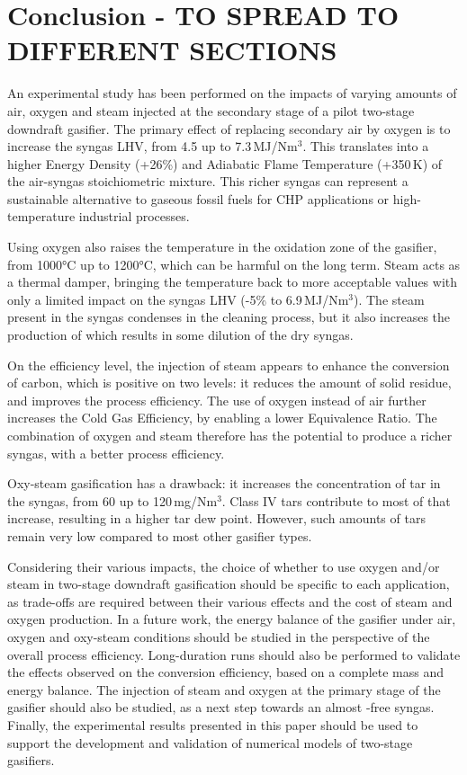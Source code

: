 \section{Conclusion - TO SPREAD TO DIFFERENT SECTIONS}
An experimental study has been performed on the impacts of varying amounts of air, oxygen and steam injected at the secondary stage of a pilot two-stage downdraft gasifier. The primary effect of replacing secondary air by oxygen is to increase the syngas LHV, from 4.5 up to 7.3\,MJ/Nm$^3$. This translates into a higher Energy Density (+26\%) and Adiabatic Flame Temperature (+350\,K) of the air-syngas stoichiometric mixture. This richer syngas can represent a sustainable alternative to gaseous fossil fuels for CHP applications or high-temperature industrial processes.

Using oxygen also raises the temperature in the oxidation zone of the gasifier, from 1000°C up to 1200°C, which can be harmful on the long term. Steam acts as a thermal damper, bringing the temperature back to more acceptable values with only a limited impact on the syngas LHV (-5\% to 6.9\,MJ/Nm$^3$). The steam present in the syngas condenses in the cleaning process, but it also increases the production of  which results in some dilution of the dry syngas.

On the efficiency level, the injection of steam appears to enhance the conversion of carbon, which is positive on two levels: it reduces the amount of solid residue, and improves the process efficiency. The use of oxygen instead of air further increases the Cold Gas Efficiency, by enabling a lower Equivalence Ratio. The combination of oxygen and steam therefore has the potential to produce a richer syngas, with a better process efficiency.

Oxy-steam gasification has a drawback: it increases the concentration of tar in the syngas, from 60 up to 120\,mg/Nm$^3$. Class IV tars contribute to most of that increase, resulting in a higher tar dew point. However, such amounts of tars remain very low compared to most other gasifier types.

Considering their various impacts, the choice of whether to use oxygen and/or steam in two-stage downdraft gasification should be specific to each application, as trade-offs are required between their various effects and the cost of steam and oxygen production. In a future work, the energy balance of the gasifier under air, oxygen and oxy-steam conditions should be studied in the perspective of the overall process efficiency. Long-duration runs should also be performed to validate the effects observed on the conversion efficiency, based on a complete mass and energy balance. The injection of steam and oxygen at the primary stage of the gasifier should also be studied, as a next step towards an almost -free syngas. Finally, the experimental results presented in this paper should be used to support the development and validation of numerical models of two-stage gasifiers.



